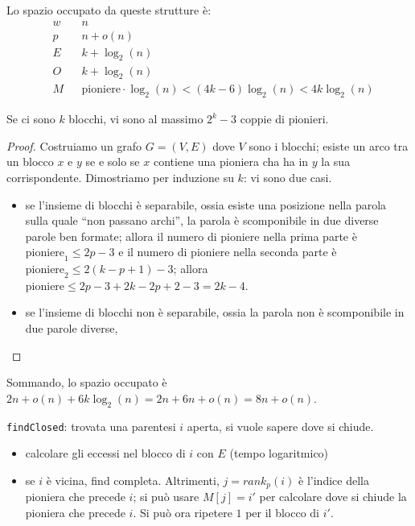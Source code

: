 Lo spazio occupato da queste strutture è:
$$
	\begin{aligned}
		 & w &  & n                                                                  \\
		 & p &  & n + o(n)                                                           \\
		 & E &  & k + \log_2(n)                                                      \\
		 & O &  & k + \log_2(n)                                                      \\
		 & M &  & \text{pioniere} \cdot \log_2(n) < (4k - 6) \log_2(n) < 4k\log_2(n)
	\end{aligned}
$$
\begin{theorem}
	Se ci sono $k$ blocchi, vi sono al massimo $2^k - 3$ coppie di pionieri.
\end{theorem}
\begin{proof}
	Costruiamo un grafo $G = (V, E)$ dove $V$ sono i blocchi; esiste un arco tra un blocco $x$ e $y$ se
	e solo se $x$ contiene una pioniera cha ha in $y$ la sua corrispondente.
	Dimostriamo per induzione su $k$: vi sono due casi.
	\begin{itemize}
		\item se l'insieme di blocchi è separabile, ossia esiste una posizione nella parola sulla quale
		      ``non passano archi'', la parola è scomponibile in due diverse parole ben formate;
		      allora il numero di pioniere nella prima parte è $\text{pioniere}_1 \leq 2p - 3$ e il
		      numero di pioniere nella seconda parte è $\text{pioniere}_2 \leq 2(k - p + 1) - 3$;
		      allora $\text{pioniere} \leq 2p - 3 + 2 k - 2p + 2 - 3 = 2k - 4$.
		\item se l'insieme di blocchi non è separabile, ossia la parola non è scomponibile in due
		      parole diverse,
	\end{itemize}
\end{proof}

Sommando, lo spazio occupato è $2n + o(n) + 6k \log_2(n) = 2n + 6n + o(n) = 8n + o(n)$.

\texttt{findClosed}: trovata una parentesi $i$ aperta, si vuole sapere dove si chiude.
\begin{itemize}
	\item calcolare gli eccessi nel blocco di $i$ con $E$ (tempo logaritmico)
	\item se $i$ è vicina, find completa. Altrimenti, $j = rank_p(i)$ è l'indice della pioniera
	      che precede $i$; si può usare $M[j] = i'$ per calcolare dove si chiude la pioniera che precede $i$.
	      Si può ora ripetere $1$ per il blocco di $i'$.

\end{itemize}

